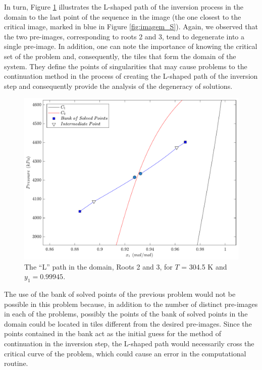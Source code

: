 \documentclass[journal=iecred,manuscript=article]{achemso}
\theoremstyle{definition}
\theoremstyle{remark}
\begin{document}
In turn, Figure \ref{fig:L_S} illustrates the L-shaped path of the inversion process in the domain to the last point of the sequence in the image (the one closest to the critical image, marked in blue in Figure \ref{fig:imagem_S}). Again, we observed that the two pre-images, corresponding to roots 2 and 3, tend to degenerate into a single pre-image. In addition, one can note the importance of knowing the critical set of the problem and, consequently, the tiles that form the domain of the system. They define the points of singularities that may cause problems to the continuation method in the process of creating the L-shaped path of the inversion step and consequently provide the analysis of the degeneracy of solutions.

\begin{figure}[!ht]
	\begin{center}
		\includegraphics[scale=0.50]{caminhos_L_degeneracao_dominio2.pdf}
		\caption{The \enquote{L} path in the domain, Roots 2 and 3, for $T$ = 304.5 K and $y_1 = 0.99945$.}\label{fig:L_S}
	\end{center}
\end{figure}

The use of the bank of solved points of the previous problem would not be possible in this problem because, in addition to the number of distinct pre-images in each of the problems, possibly the points of the bank of solved points in the domain could be located in tiles different from the desired pre-images. Since the points contained in the bank act as the initial guess for the method of continuation in the inversion step, the L-shaped path would necessarily cross the critical curve of the problem, which could cause an error in the computational routine.
\end{document}

